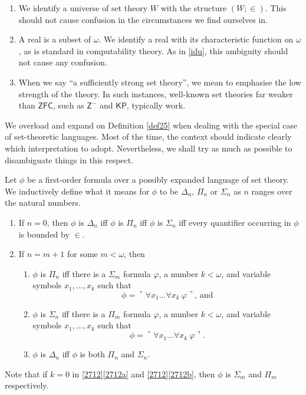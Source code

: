 \documentclass[12pt]{article}
\numberwithin{equation}{section}
\begin{document}
\begin{con}
\begin{enumerate}[label=(\arabic*)]
    \item\label{idu} We identify a universe of set theory $W$ with the structure $(W; \in)$. This should not cause confusion in the circumstances we find ourselves in.
    \item A real is a subset of $\omega$. We identify a real with its characteristic function on $\omega$, as is standard in computability theory. As in \ref{idu}, this ambiguity should not cause any confusion.
    \item When we say ``a sufficiently strong set theory'', we mean to emphasise the low strength of the theory. In such instances, well-known set theories far weaker than $\mathsf{ZFC}$, such as $\mathsf{Z^-}$ and $\mathsf{KP}$, typically work.
\end{enumerate}
\end{con}

We overload and expand on Definition \ref{def25} when dealing with the special case of set-theoretic languages. Most of the time, the context should indicate clearly which interpretation to adopt. Nevertheless, we shall try as much as possible to disambiguate things in this respect.

\begin{defi}\label{def27}
Let $\phi$ be a first-order formula over a possibly expanded language of set theory. We inductively define what it means for $\phi$ to be $\Delta_n$, $\Pi_n$ or $\Sigma_n$ as $n$ ranges over the natural numbers.
\begin{enumerate}[label=(\arabic*)]
    \item\label{def271} If $n = 0$, then $\phi$ is $\Delta_n$ iff $\phi$ is $\Pi_n$ iff $\phi$ is $\Sigma_n$ iff every quantifier occurring in $\phi$ is bounded by $\in$.
    \item\label{2712} If $n = m + 1$ for some $m < \omega$, then 
    \begin{enumerate}[label=(\alph*)]
        \item\label{2712a} $\phi$ is $\Pi_n$ iff there is a $\Sigma_m$ formula $\varphi$, a number $k < \omega$, and variable symbols $x_1, \dots, x_k$ such that 
        \begin{equation*}
            \phi = \ulcorner \forall x_1 \dots \forall x_k \ \varphi \urcorner \text{, and}
        \end{equation*}
        \item\label{2712b} $\phi$ is $\Sigma_n$ iff there is a $\Pi_m$ formula $\varphi$, a number $k < \omega$, and variable symbols $x_1, \dots, x_k$ such that 
        \begin{equation*}
            \phi = \ulcorner \forall x_1 \dots \forall x_k \ \varphi \urcorner \text{.}
        \end{equation*}
        \item $\phi$ is $\Delta_n$ iff $\phi$ is both $\Pi_n$ and $\Sigma_n$.
    \end{enumerate}
\end{enumerate}
Note that if $k = 0$ in \ref{2712}\ref{2712a} and \ref{2712}\ref{2712b}, then $\phi$ is $\Sigma_m$ and $\Pi_m$ respectively.
\end{defi}
\end{document}
